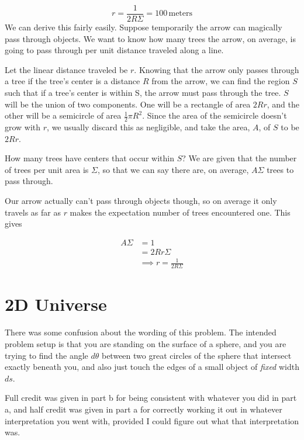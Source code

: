 \documentclass[12pt]{article}
\begin{document}
\[\boxed{r = \frac{1}{2R\Sigma}= 100 \,\mathrm{meters}}
\]
\newline
We can derive this fairly easily. Suppose temporarily the arrow can magically pass through objects. We want to know how many trees the arrow, on average, is going to pass through per unit distance traveled along a line.

Let the linear distance traveled be \(r\). Knowing that the arrow only passes through a tree if the tree's center is a distance \(R\) from the arrow, we can find the region \(S\) such that if a tree's center is within S, the arrow must pass through the tree. \(S\) will be the union of two components. One will be a rectangle of area \(2Rr\), and the other will be a semicircle of area \(\frac{1}{2}\pi R^2\). Since the area of the semicircle doesn't grow with \(r\), we usually discard this as negligible, and take the area, \(A\), of \(S\) to be \(2Rr\).

How many trees have centers that occur within \(S\)? We are given that the number of trees per unit area is \(\Sigma\), so that we can say there are, on average, \(A\Sigma\) trees to pass through.

Our arrow actually can't pass through objects though, so on average it only travels as far as \(r\) makes the expectation number of trees encountered one. This gives

\begin{align*}
A\Sigma &= 1 \\
&= 2Rr\Sigma \\
&\implies r = \frac{1}{2R\Sigma}
\end{align*}

\section{2D Universe}

There was some confusion about the wording of this problem. The intended problem setup is that you are standing on the surface of a sphere, and you are trying to find the angle \(d\theta\) between two great circles of the sphere that intersect exactly beneath you, and also just touch the edges of a small object of \textit{fixed} width \(ds\).

Full credit was given in part b for being consistent with whatever you did in part a, and half credit was given in part a for correctly working it out in whatever interpretation you went with, provided I could figure out what that interpretation was.
\end{document}
